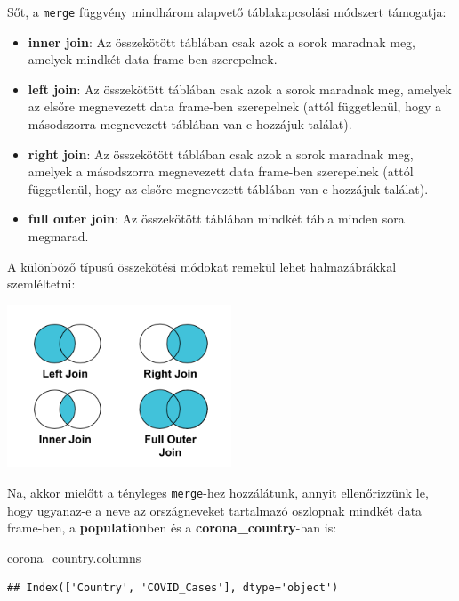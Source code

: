 \documentclass[
]{book}
\newenvironment{Shaded}{\begin{snugshade}}{\end{snugshade}}
\newcommand{\NormalTok}[1]{#1}
\providecommand{\tightlist}{%
  \setlength{\itemsep}{0pt}\setlength{\parskip}{0pt}}
\begin{document}
Sőt, a \texttt{merge} függvény mindhárom alapvető táblakapcsolási módszert támogatja:

\begin{itemize}
\tightlist
\item
  \textbf{inner join}: Az összekötött táblában csak azok a sorok maradnak meg, amelyek mindkét data frame-ben szerepelnek.
\item
  \textbf{left join}: Az összekötött táblában csak azok a sorok maradnak meg, amelyek az elsőre megnevezett data frame-ben szerepelnek (attól függetlenül, hogy a másodszorra megnevezett táblában van-e hozzájuk találat).
\item
  \textbf{right join}: Az összekötött táblában csak azok a sorok maradnak meg, amelyek a másodszorra megnevezett data frame-ben szerepelnek (attól függetlenül, hogy az elsőre megnevezett táblában van-e hozzájuk találat).
\item
  \textbf{full outer join}: Az összekötött táblában mindkét tábla minden sora megmarad.
\end{itemize}

A különböző típusú összekötési módokat remekül lehet halmazábrákkal szemléltetni:

\includegraphics[width=0.5\textwidth,height=\textheight]{JoinVennDiagram.png}

Na, akkor mielőtt a tényleges \texttt{merge}-hez hozzálátunk, annyit ellenőrizzünk le, hogy ugyanaz-e a neve az országneveket tartalmazó oszlopnak mindkét data frame-ben, a \textbf{population}ben és a \textbf{corona\_country}-ban is:

\begin{Shaded}
\begin{Highlighting}[]
\NormalTok{corona\_country.columns}
\end{Highlighting}
\end{Shaded}

\begin{verbatim}
## Index(['Country', 'COVID_Cases'], dtype='object')
\end{verbatim}
\end{document}
